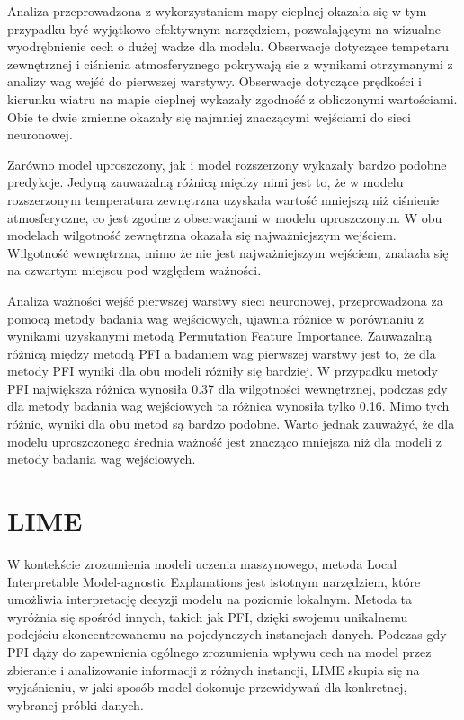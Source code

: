 \documentclass[a4paper,twoside,12pt]{book}
\begin{document}
Analiza przeprowadzona z wykorzystaniem mapy cieplnej okazała się w tym przypadku być wyjątkowo efektywnym narzędziem, pozwalającym na wizualne wyodrębnienie cech o dużej wadze dla modelu. Obserwacje dotyczące tempetaru zewnętrznej i ciśnienia atmosferyznego pokrywają sie z wynikami otrzymanymi z analizy wag wejść do pierwszej warstywy. Obserwacje dotyczące prędkości i kierunku wiatru na mapie cieplnej wykazały zgodność z obliczonymi wartościami. Obie te dwie zmienne okazały się najmniej znaczącymi wejściami do sieci neuronowej.

Zarówno model uproszczony, jak i model rozszerzony wykazały bardzo podobne predykcje. Jedyną zauważalną różnicą między nimi jest to, że w modelu rozszerzonym temperatura zewnętrzna uzyskała wartość mniejszą niż ciśnienie atmosferyczne, co jest zgodne z obserwacjami w modelu uproszczonym. W obu modelach wilgotność zewnętrzna okazała się najważniejszym wejściem. Wilgotność wewnętrzna, mimo że nie jest najważniejszym wejściem, znalazła się na czwartym miejscu pod względem ważności.

Analiza ważności wejść pierwszej warstwy sieci neuronowej, przeprowadzona za pomocą metody badania wag wejściowych, ujawnia różnice w porównaniu z wynikami uzyskanymi metodą Permutation Feature Importance. Zauważalną różnicą między metodą PFI a badaniem wag pierwszej warstwy jest to, że dla metody PFI wyniki dla obu modeli różniły się bardziej. W przypadku metody PFI największa różnica wynosiła 0.37 dla wilgotności wewnętrznej, podczas gdy dla metody badania wag wejściowych ta różnica wynosiła tylko 0.16. Mimo tych różnic, wyniki dla obu metod są bardzo podobne. Warto jednak zauważyć, że dla modelu uproszczonego średnia ważność jest znacząco mniejsza niż dla modeli z metody badania wag wejściowych.

\newpage
\section{LIME}
W kontekście zrozumienia modeli uczenia maszynowego, metoda Local Interpretable Model-agnostic Explanations jest istotnym narzędziem, które umożliwia interpretację decyzji modelu na poziomie lokalnym. Metoda ta wyróżnia się spośród innych, takich jak PFI, dzięki swojemu unikalnemu podejściu skoncentrowanemu na pojedynczych instancjach danych. Podczas gdy PFI dąży do zapewnienia ogólnego zrozumienia wpływu cech na model przez zbieranie i analizowanie informacji z różnych instancji, LIME skupia się na wyjaśnieniu, w jaki sposób model dokonuje przewidywań dla konkretnej, wybranej próbki danych.
\end{document}
